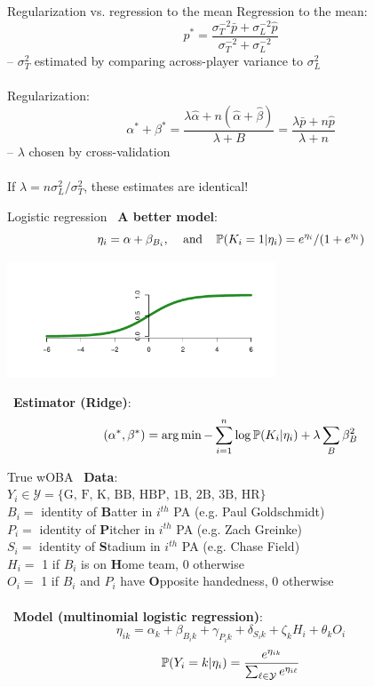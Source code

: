 \documentclass{beamer}
\def\Y{\mathcal Y}\def\Z{\mathcal Z}
\begin{document}
\begin{frame}{Regularization vs. regression to the mean}
Regression to the mean:
$$p^* = \frac{\sigma_T^{-2}\bar p + \sigma_L^{-2}\hat p}
    {\sigma_T^{-2} + \sigma_L^{-2}}$$
-- $\sigma_T^2$ estimated by comparing across-player variance to
    $\sigma^2_L$\\~\\
Regularization:
$$\alpha^* + \beta^* = \frac{\lambda\hat\alpha + n(\hat\alpha + \hat\beta)}
    {\lambda + B} = \frac{\lambda\bar p + n\hat p}{\lambda + n}$$
-- $\lambda$ chosen by cross-validation\\~\\
If $\lambda = n\sigma^2_L/\sigma^2_T$, these estimates are identical!
\end{frame}

\begin{frame}{Logistic regression}
~{\bf A better model}:
$$\eta_i = \alpha + \beta_{B_i}, \hspace{4mm}\mbox{and}\hspace{4mm}
\mathbb P(K_i = 1|\eta_i) = e^{\eta_i}/(1+e^{\eta_i})$$
\begin{center}
\includegraphics[width = 0.6\textwidth]{../figs/logistic.pdf}
\end{center}
~{\bf Estimator (Ridge)}:
$$(\alpha^*, \beta^*) = \arg\min-\sum_{i=1}^n\log\mathbb P(K_i|\eta_i) +
    \lambda\sum_B\beta_B^2$$
\end{frame}

\begin{frame}{True wOBA}
~{\bf Data}:\\
$Y_i \in \Y = \{\mbox{G, F, K, BB, HBP, 1B, 2B, 3B, HR}\}$\\
$B_i =$ identity of {\bf B}atter in $i^{th}$ PA (e.g. Paul Goldschmidt)\\
$P_i =$ identity of {\bf P}itcher in $i^{th}$ PA (e.g. Zach Greinke)\\
$S_i =$ identity of {\bf S}tadium in $i^{th}$ PA (e.g. Chase Field)\\
$H_i =$ 1 if $B_i$ is on {\bf H}ome team, 0 otherwise\\
$O_i =$ 1 if $B_i$ and $P_i$ have {\bf O}pposite handedness, 0 otherwise\\~\\
~{\bf Model (multinomial logistic regression)}:
$$\eta_{ik} = \alpha_k + \beta_{B_ik} + \gamma_{P_ik} +
    \delta_{S_ik} + \zeta_kH_i + \theta_kO_i$$
$$\mP(Y_i=k|\eta_i) = \frac{e^{\eta_{ik}}}{\sum_{\ell\in\Y}e^{\eta_{i\ell}}}$$
\end{frame}
\end{document}
